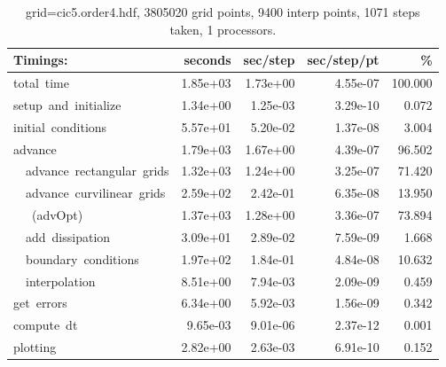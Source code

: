 \begin{table}[hbt]
\begin{center}\footnotesize
\begin{tabular}{|l|r|r|r|r|} \hline
  Timings:   &  seconds &    sec/step  &  sec/step/pt &  \%    \\ \hline
total~time\dotfill &   1.85e+03 &   1.73e+00 &   4.55e-07 & 100.000 \\ 
setup~and~initialize\dotfill &   1.34e+00 &   1.25e-03 &   3.29e-10 &   0.072 \\ 
initial~conditions\dotfill &   5.57e+01 &   5.20e-02 &   1.37e-08 &   3.004 \\ 
advance\dotfill &   1.79e+03 &   1.67e+00 &   4.39e-07 &  96.502 \\ 
~~advance~rectangular~grids\dotfill &   1.32e+03 &   1.24e+00 &   3.25e-07 &  71.420 \\ 
~~advance~curvilinear~grids\dotfill &   2.59e+02 &   2.42e-01 &   6.35e-08 &  13.950 \\ 
~~~(advOpt)\dotfill &   1.37e+03 &   1.28e+00 &   3.36e-07 &  73.894 \\ 
~~add~dissipation\dotfill &   3.09e+01 &   2.89e-02 &   7.59e-09 &   1.668 \\ 
~~boundary~conditions\dotfill &   1.97e+02 &   1.84e-01 &   4.84e-08 &  10.632 \\ 
~~interpolation\dotfill &   8.51e+00 &   7.94e-03 &   2.09e-09 &   0.459 \\ 
get~errors\dotfill &   6.34e+00 &   5.92e-03 &   1.56e-09 &   0.342 \\ 
compute~dt\dotfill &   9.65e-03 &   9.01e-06 &   2.37e-12 &   0.001 \\ 
plotting\dotfill &   2.82e+00 &   2.63e-03 &   6.91e-10 &   0.152 \\ 
 \hline 
\end{tabular}
\end{center}
\caption{grid=cic5.order4.hdf, 3805020 grid points, 9400 interp points, 1071 steps taken, 1 processors.}
\label{tab:cic5.order4.hdf}
\end{table}



